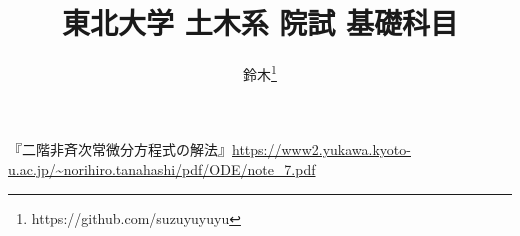 \documentclass[10pt, a4paper]{ltjsarticle}
\title{東北大学 土木系 院試 基礎科目}
\author{鈴木\thanks{https://github.com/suzuyuyuyu}}
\date{}
\begin{document}
\pagestyle{empty}
\maketitle
\tableofcontents


\pagestyle{appendixPS}


















\newpage





\newpage
\begin{thebibliography}{99}
  『二階非斉次常微分方程式の解法』\url{https://www2.yukawa.kyoto-u.ac.jp/~norihiro.tanahashi/pdf/ODE/note_7.pdf}
\end{thebibliography}
\end{document}
